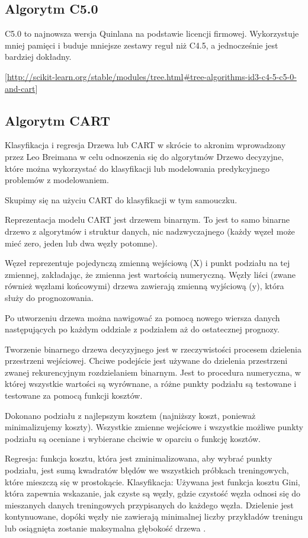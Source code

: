 \documentclass[10pt,a4paper]{article}
\begin{document}
\subsection{Algorytm C5.0}
C5.0 to najnowsza wersja Quinlana na podstawie licencji firmowej. Wykorzystuje mniej pamięci i buduje mniejsze zestawy reguł niż C4.5, a jednocześnie jest bardziej dokładny.

[\url{http://scikit-learn.org/stable/modules/tree.html#tree-algorithms-id3-c4-5-c5-0-and-cart}]

\subsection{Algorytm CART}
Klasyfikacja i regresja Drzewa lub CART w skrócie to akronim wprowadzony przez Leo Breimana w celu odnoszenia się do algorytmów Drzewo decyzyjne, które można wykorzystać do klasyfikacji lub modelowania predykcyjnego problemów z modelowaniem.

Skupimy się na użyciu CART do klasyfikacji w tym samouczku.

Reprezentacja modelu CART jest drzewem binarnym. To jest to samo binarne drzewo z algorytmów i struktur danych, nic nadzwyczajnego (każdy węzeł może mieć zero, jeden lub dwa węzły potomne).

Węzeł reprezentuje pojedynczą zmienną wejściową (X) i punkt podziału na tej zmiennej, zakładając, że zmienna jest wartością numeryczną. Węzły liści (zwane również węzłami końcowymi) drzewa zawierają zmienną wyjściową (y), która służy do prognozowania.

Po utworzeniu drzewa można nawigować za pomocą nowego wiersza danych następujących po każdym oddziale z podziałem aż do ostatecznej prognozy.

Tworzenie binarnego drzewa decyzyjnego jest w rzeczywistości procesem dzielenia przestrzeni wejściowej. Chciwe podejście jest używane do dzielenia przestrzeni zwanej rekurencyjnym rozdzielaniem binarnym. Jest to procedura numeryczna, w której wszystkie wartości są wyrównane, a różne punkty podziału są testowane i testowane za pomocą funkcji kosztów.

Dokonano podziału z najlepszym kosztem (najniższy koszt, ponieważ minimalizujemy koszty). Wszystkie zmienne wejściowe i wszystkie możliwe punkty podziału są oceniane i wybierane chciwie w oparciu o funkcję kosztów.

Regresja: funkcja kosztu, która jest zminimalizowana, aby wybrać punkty podziału, jest sumą kwadratów błędów we wszystkich próbkach treningowych, które mieszczą się w prostokącie.
Klasyfikacja: Używana jest funkcja kosztu Gini, która zapewnia wskazanie, jak czyste są węzły, gdzie czystość węzła odnosi się do mieszanych danych treningowych przypisanych do każdego węzła.
Dzielenie jest kontynuowane, dopóki węzły nie zawierają minimalnej liczby przykładów treningu lub osiągnięta zostanie maksymalna głębokość drzewa \cite{Brownlee2017}.
\end{document}
